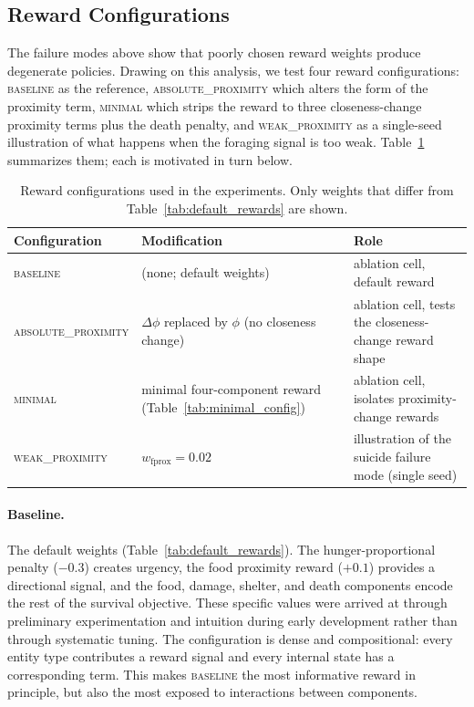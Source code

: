 \documentclass[12pt,a4paper,titlepage]{article}
\begin{document}
\subsection{Reward Configurations}
\label{sec:reward_configs}

The failure modes above show that poorly chosen reward weights produce degenerate policies. Drawing on this analysis, we test four reward configurations: \textsc{baseline} as the reference, \textsc{absolute\_proximity} which alters the form of the proximity term, \textsc{minimal} which strips the reward to three closeness-change proximity terms plus the death penalty, and \textsc{weak\_proximity} as a single-seed illustration of what happens when the foraging signal is too weak. Table~\ref{tab:reward_configs} summarizes them; each is motivated in turn below.

\begin{table}[!ht]
\centering
\caption{Reward configurations used in the experiments. Only weights that differ from Table~\ref{tab:default_rewards} are shown.}
\label{tab:reward_configs}
\small
\begin{tabularx}{\textwidth}{l >{\raggedright\arraybackslash}X >{\raggedright\arraybackslash}X}
\toprule
Configuration & Modification & Role \\
\midrule
\textsc{baseline}            & (none; default weights)                        & ablation cell, default reward \\
\textsc{absolute\_proximity} & $\Delta\phi$ replaced by $\phi$ (no closeness change) & ablation cell, tests the closeness-change reward shape \\
\textsc{minimal}      & minimal four-component reward (Table~\ref{tab:minimal_config}) & ablation cell, isolates proximity-change rewards \\
\textsc{weak\_proximity}     & $w_\text{fprox} = 0.02$                           & illustration of the suicide failure mode (single seed) \\
\bottomrule
\end{tabularx}
\end{table}

\paragraph{Baseline.} The default weights (Table~\ref{tab:default_rewards}). The hunger-proportional penalty ($-0.3$) creates urgency, the food proximity reward ($+0.1$) provides a directional signal, and the food, damage, shelter, and death components encode the rest of the survival objective. These specific values were arrived at through preliminary experimentation and intuition during early development rather than through systematic tuning. The configuration is dense and compositional: every entity type contributes a reward signal and every internal state has a corresponding term. This makes \textsc{baseline} the most informative reward in principle, but also the most exposed to interactions between components.
\end{document}
